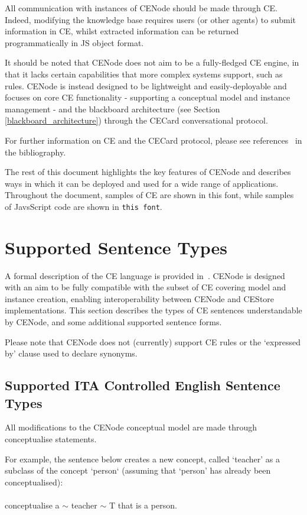 \documentclass{scrartcl}
\newcommand{\ce}[1]{\textsf{#1}}
\newcommand{\js}[1]{\texttt{#1}}
\begin{document}
All communication with instances of CENode should be made through CE. Indeed, modifying the knowledge base requires users (or other agents) to submit information in CE, whilst extracted information can be returned programmatically in JS object format.

It should be noted that CENode does not aim to be a fully-fledged CE engine, in that it lacks certain capabilities that more complex systems support, such as rules. CENode is instead designed to be lightweight and easily-deployable and focuses on core CE functionality - supporting a conceptual model and instance management - and the blackboard architecture (see Section \ref{blackboard_architecture}) through the CECard conversational protocol.

For further information on CE and the CECard protocol, please see references~\cite{preece14hmc,preece14cs,ping12} in the bibliography.

The rest of this document highlights the key features of CENode and describes ways in which it can be deployed and used for a wide range of applications. Throughout the document, samples of CE are shown in \ce{this font}, while samples of JavsScript code are shown in \js{this font}.

\section{Supported Sentence Types}
A formal description of the CE language is provided in~\cite{Mott2010}. CENode is designed with an aim to be fully compatible with the subset of CE covering model and instance creation, enabling interoperability between CENode and CEStore implementations. This section describes the types of CE sentences understandable by CENode, and some additional supported sentence forms.

Please note that CENode does not (currently) support CE rules or the `expressed by' clause used to declare synonyms.

\subsection{Supported ITA Controlled English Sentence Types}
All modifications to the CENode conceptual model are made through \ce{conceptualise} statements.

For example, the sentence below creates a new concept, called `teacher' as a subclass of the concept `person` (assuming that `person' has already been conceptualised):\\
\\\ce{conceptualise a $\sim$ teacher $\sim$ T that is a person.}\\
\end{document}
